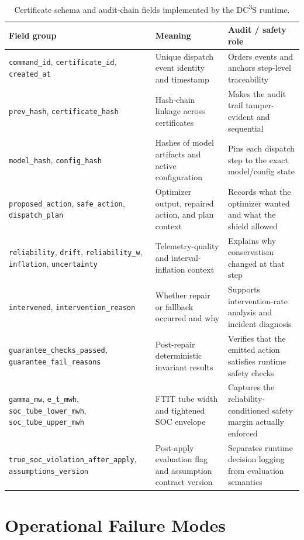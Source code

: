 \documentclass[11pt,a4paper]{article}
\begin{document}
\begin{table}[htbp]
\centering\footnotesize
\caption{Certificate schema and audit-chain fields implemented by the DC\textsuperscript{3}S runtime.}
\label{tab:certificate_schema}
\begin{tabular}{p{3.0cm}p{4.3cm}p{3.8cm}}
\toprule
Field group & Meaning & Audit / safety role \\
\midrule
\texttt{command\_id}, \texttt{certificate\_id}, \texttt{created\_at} & Unique dispatch event identity and timestamp & Orders events and anchors step-level traceability \\
\texttt{prev\_hash}, \texttt{certificate\_hash} & Hash-chain linkage across certificates & Makes the audit trail tamper-evident and sequential \\
\texttt{model\_hash}, \texttt{config\_hash} & Hashes of model artifacts and active configuration & Pins each dispatch step to the exact model/config state \\
\texttt{proposed\_action}, \texttt{safe\_action}, \texttt{dispatch\_plan} & Optimizer output, repaired action, and plan context & Records what the optimizer wanted and what the shield allowed \\
\texttt{reliability}, \texttt{drift}, \texttt{reliability\_w}, \texttt{inflation}, \texttt{uncertainty} & Telemetry-quality and interval-inflation context & Explains why conservatism changed at that step \\
\texttt{intervened}, \texttt{intervention\_reason} & Whether repair or fallback occurred and why & Supports intervention-rate analysis and incident diagnosis \\
\texttt{guarantee\_checks\_passed}, \texttt{guarantee\_fail\_reasons} & Post-repair deterministic invariant results & Verifies that the emitted action satisfies runtime safety checks \\
\texttt{gamma\_mw}, \texttt{e\_t\_mwh}, \texttt{soc\_tube\_lower\_mwh}, \texttt{soc\_tube\_upper\_mwh} & FTIT tube width and tightened SOC envelope & Captures the reliability-conditioned safety margin actually enforced \\
\texttt{true\_soc\_violation\_after\_apply}, \texttt{assumptions\_version} & Post-apply evaluation flag and assumption contract version & Separates runtime decision logging from evaluation semantics \\
\bottomrule
\end{tabular}
\end{table}

\section{Operational Failure Modes}\label{app:failure_modes}
\end{document}
